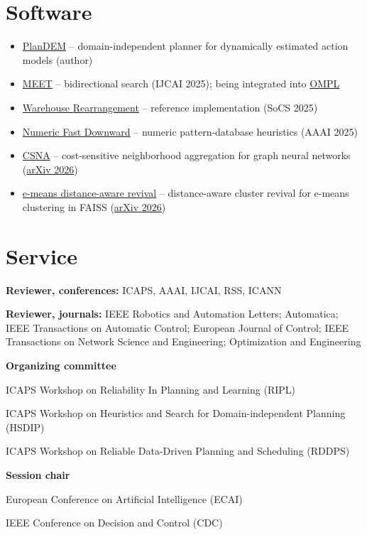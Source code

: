 \documentclass[10pt,letterpaper]{article}
\let\origsection\section
\renewcommand{\section}[1]{\Needspace*{5\baselineskip}\origsection{#1}}
\newlength{\datecol}\setlength{\datecol}{1.45in}
\newlength{\bulw}\setlength{\bulw}{1.1em}
\newenvironment{datedlist}{\par\begingroup\setlength{\parskip}{0pt}}{\endgroup\par}
\newcommand{\bitem}[2]{\noindent
  \makebox[\bulw][l]{\textbullet}%
  \parbox[t]{\dimexpr\textwidth-\bulw-\datecol-1em\relax}{\RaggedRight #1}\hfill
  \makebox[\datecol][r]{\color{dategray}#2}\par\vspace{2pt}}
\newcommand{\blast}[2]{\bitem{#1}{#2}}
\begin{document}
\section{Software}
\begin{itemize}
  \item \href{https://github.com/eyal-weiss/plandem-public}{PlanDEM} -- domain-independent planner for dynamically estimated action models (author)
  \item \href{https://github.com/yi213-robotic/MEET}{MEET} -- bidirectional search (IJCAI 2025); being integrated into \href{https://ompl.kavrakilab.org/}{OMPL}
  \item \href{https://github.com/CRL-Technion/wh-rearrangement}{Warehouse Rearrangement} -- reference implementation (SoCS 2025)
  \item \href{https://github.com/dgnad/numeric-fast-downward}{Numeric Fast Downward} -- numeric pattern-database heuristics (AAAI 2025)
  \item \href{https://github.com/eyal-weiss/CSNA-public}{CSNA} -- cost-sensitive neighborhood aggregation for graph neural networks (\href{https://arxiv.org/abs/2603.24291}{arXiv 2026})
  \item \href{https://github.com/eyal-weiss/emeans-distance-revival}{e-means distance-aware revival} -- distance-aware cluster revival for e-means clustering in FAISS (\href{https://arxiv.org/abs/2611.18238}{arXiv 2026})
\end{itemize}

\section{Service}
\textbf{Reviewer, conferences:} ICAPS, AAAI, IJCAI, RSS, ICANN

\textbf{Reviewer, journals:} IEEE Robotics and Automation Letters; Automatica; IEEE Transactions on Automatic Control; European Journal of Control; IEEE Transactions on Network Science and Engineering; Optimization and Engineering

\vspace{3pt}
\textbf{Organizing committee}
\begin{datedlist}
\bitem{ICAPS Workshop on Reliability In Planning and Learning (RIPL)}{2026}
\bitem{ICAPS Workshop on Heuristics and Search for Domain-independent Planning \mbox{(HSDIP)}}{2025}
\blast{ICAPS Workshop on Reliable Data-Driven Planning and Scheduling (RDDPS)}{2023, 2024}
\end{datedlist}
\vspace{3pt}
\textbf{Session chair}
\begin{datedlist}
\bitem{European Conference on Artificial Intelligence (ECAI)}{2023}
\blast{IEEE Conference on Decision and Control (CDC)}{2018}
\end{datedlist}
\end{document}
